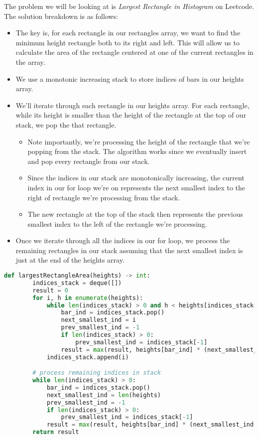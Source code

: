 The problem we will be looking at is \textit{Largest Rectangle in Histogram} on Leetcode. The solution breakdown is as follows:
\begin{itemize}
    \item The key is, for each rectangle in our rectangles array, we want to find the minimum height rectangle both to its right and left. 
    This will allow us to calculate the area of the rectangle centered at one of the current rectangles in the array.
    \item We use a monotonic increasing stack to store indices of bars in our heights array. 
    \item We'll iterate through each rectangle in our heights array. For each rectangle, while its height is smaller than the height of the 
          rectangle at the top of our stack, we pop the that rectangle. 
    \begin{itemize}
        \item Note importantly, we're processing the height of the rectangle that we're popping from the stack. The algorithm works since
        we eventually insert and pop every rectangle from our stack.
        \item Since the indices in our stack are monotonically increasing, the current index in our for loop we're on represents the next 
        smallest index to the right of rectangle we're processing from the stack.
        \item The new rectangle at the top of the stack then represents the previous smallest index to the left of the rectangle we're processing.
    \end{itemize}
    \item Once we iterate through all the indices in our for loop, we process the remaining rectangles in our stack assuming that the next smallest index is 
    just at the end of the heights array. 
\end{itemize}

\begin{lstlisting}[language=Python, caption=Next Greater Element I]
    def largestRectangleArea(heights) -> int:
        indices_stack = deque([])
        result = 0
        for i, h in enumerate(heights):
            while len(indices_stack) > 0 and h < heights[indices_stack[-1]]:
                bar_ind = indices_stack.pop()
                next_smallest_ind = i
                prev_smallest_ind = -1
                if len(indices_stack) > 0:
                    prev_smallest_ind = indices_stack[-1]
                result = max(result, heights[bar_ind] * (next_smallest_ind - prev_smallest_ind - 1))
            indices_stack.append(i)

        # process remaining indices in stack
        while len(indices_stack) > 0:
            bar_ind = indices_stack.pop()
            next_smallest_ind = len(heights)
            prev_smallest_ind = -1
            if len(indices_stack) > 0:
                prev_smallest_ind = indices_stack[-1]
            result = max(result, heights[bar_ind] * (next_smallest_ind - prev_smallest_ind - 1))
        return result
\end{lstlisting}

